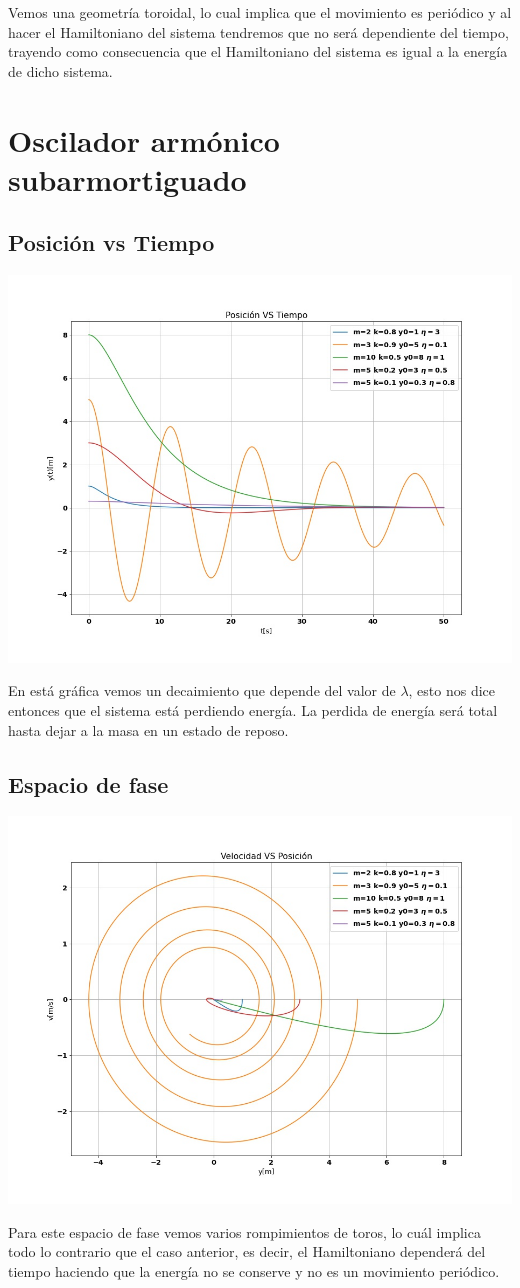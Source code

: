 \documentclass{article}
\begin{document}
Vemos una geometría toroidal, lo cual implica que el movimiento es periódico y al hacer el Hamiltoniano del sistema tendremos que no será dependiente del tiempo, trayendo como consecuencia que el Hamiltoniano del sistema es igual a la energía de dicho sistema.


\section{Oscilador armónico subarmortiguado}

\subsection{Posición vs Tiempo}

\includegraphics[width=0.7\linewidth]{posición2.jpg}

En está gráfica vemos un decaimiento que depende del valor de $\lambda$, esto nos dice entonces que el sistema está perdiendo energía. La perdida de energía será total hasta dejar a la masa en un estado de reposo.

\subsection{Espacio de fase}

\includegraphics[width=0.7\linewidth]{fases2.jpg}

Para este espacio de fase vemos varios rompimientos de toros, lo cuál implica todo lo contrario que el caso anterior, es decir, el Hamiltoniano dependerá del tiempo haciendo que la energía no se conserve y no es un movimiento periódico.
\end{document}
